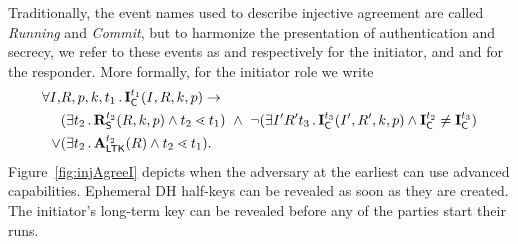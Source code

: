Traditionally, the event names used to describe injective agreement are called
\emph{Running} and \emph{Commit}, but to harmonize the presentation of
authentication and secrecy, we refer to these events as \mIStart{} and
\mIComplete{} respectively for the initiator, and \mRStart{} and \mRComplete{}
for the responder.
%
More formally, for the initiator role we write
\begin{align*}
    \forall I,& R, p, k, t_1\mLogicDot \mIComplete^{t_1}(I, R, k, p)
    \rightarrow\\
    &(\exists t_2\mLogicDot \mRStart^{t_2}(R, k, p) \land t_2 \lessdot t_1)\ 
    \land\ \neg(\exists I' R' t_3 \mLogicDot \mIComplete^{t_3}(I' , R', k, p)
        \land \mIComplete^{t_2} \not = \mIComplete^{t_3}) \\
    \lor&(\exists t_2\mLogicDot \mRevLTK^{t_2}(R) \land t_2 \lessdot t_1).
\end{align*}
%
Figure~\ref{fig:injAgreeI} depicts when the adversary at the earliest can use
advanced capabilities.
%
Ephemeral DH half-keys can be revealed as soon as they are created.
%
The initiator's long-term key can be revealed before any of the parties start
their runs.
%
